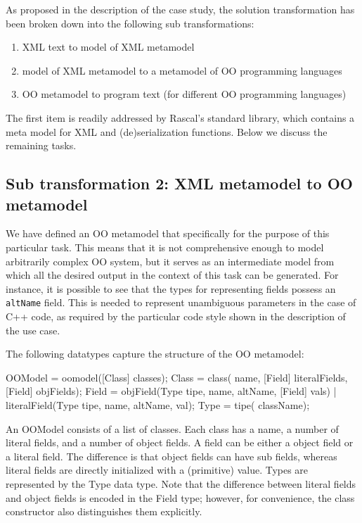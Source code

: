 \documentclass[submission,copyright,creativecommons]{eptcs}
\begin{document}
As proposed in the description of the case study, the solution transformation has been broken down into the following sub transformations:

\begin{enumerate}
\item XML text to model of XML metamodel
\item model of XML metamodel to a metamodel of OO programming languages
\item OO metamodel to program text (for different OO programming languages)
\end{enumerate}
The first item is readily addressed by Rascal's standard library, which contains a meta model for XML and (de)serialization functions.
Below we discuss the remaining tasks.


\subsection{Sub transformation 2: XML metamodel to OO metamodel}

We have defined an OO metamodel that specifically for the purpose of this particular task. 
This means that it is not  comprehensive enough to model arbitrarily complex OO system, but it serves as an intermediate model from which all the desired output in the context of this task can be generated. 
For instance, it is possible to see that the types for representing fields possess an \texttt{altName} field. This is needed to represent unambiguous parameters in the case of C++ code, as required by the particular code style shown in the description of the use case. 

The following datatypes capture the structure of the OO metamodel:
\begin{rascal}
 OOModel = oomodel([Class] classes);
 Class = class( name, [Field] literalFields, [Field] objFields);
 Field = objField(Type tipe,  name,  altName, [Field] vals) 
           | literalField(Type tipe,  name,  altName,  val);
 Type = tipe( className);
\end{rascal}

An OOModel consists of a list of classes. Each class has a name, a number of literal fields, and a number of object fields. A field can be either a object field or a literal field. The difference is that object fields can have sub fields, whereas literal fields are directly initialized with a (primitive) value. Types are represented by the Type data type. 
Note that the difference between literal fields and object fields is encoded in the Field type; however, for convenience, the class constructor also distinguishes them explicitly. 
\end{document}
